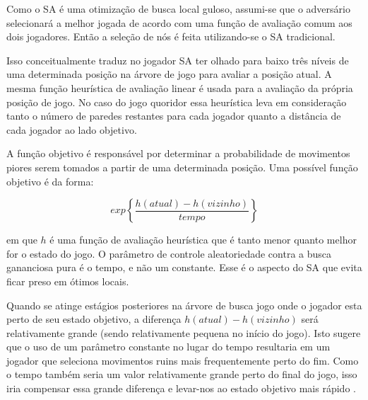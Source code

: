 Como o SA é uma otimização de busca local guloso, assumi-se que o adversário
selecionará a melhor jogada de acordo com uma função de avaliação comum aos dois
jogadores. Então a seleção de nós é feita utilizando-se o SA tradicional.

Isso conceitualmente traduz no jogador SA ter olhado para baixo três níveis de
uma determinada posição na árvore de jogo para avaliar a posição atual. A mesma
função heurística de avaliação linear é usada para a avaliação da própria
posição de jogo. No caso do jogo quoridor essa heurística leva em consideração
tanto o número de paredes restantes para cada jogador quanto a distância de cada
jogador ao lado objetivo.

A função objetivo é responsável por determinar a probabilidade de movimentos
piores serem tomados a partir de uma determinada posição. Uma possível função
objetivo é da forma:

\begin{equation}
  exp\left\{\frac{h(atual)- h(vizinho)}{tempo}\right\}
\end{equation}

em que $h$ é uma função de avaliação heurística que é tanto menor quanto melhor
for o estado do jogo. O parâmetro de controle aleatoriedade contra a busca
gananciosa pura é o tempo, e não um constante. Esse é o aspecto do SA que evita
ficar preso em ótimos locais.

Quando se atinge estágios posteriores na árvore de busca jogo onde o jogador
esta perto de seu estado objetivo, a diferença $h(atual)- h(vizinho)$
será relativamente grande (sendo relativamente pequena no início do jogo). Isto
sugere que o uso de um parâmetro constante no lugar do tempo resultaria em um
jogador que seleciona movimentos ruins mais frequentemente perto do fim.
Como o tempo também seria um valor relativamente grande perto do final do jogo,
isso iria compensar essa grande diferença e levar-nos ao estado objetivo mais
rápido \cite{mcdermid2003gaquoridor}.

